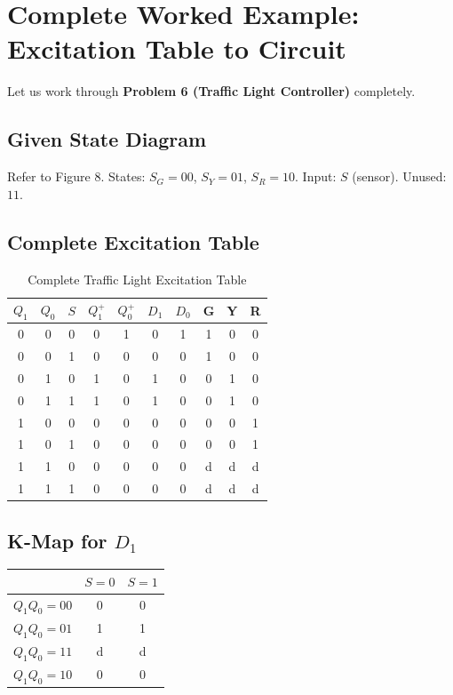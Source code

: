 \documentclass[12pt,a4paper]{article}
\begin{document}
\section{Complete Worked Example: Excitation Table to Circuit}
\label{sec:full_example}

Let us work through \textbf{Problem 6 (Traffic Light Controller)} completely.

\subsection{Given State Diagram}
Refer to Figure 8. States: $S_G=00$, $S_Y=01$, $S_R=10$. Input: $S$ (sensor). Unused: $11$.

\subsection{Complete Excitation Table}

\begin{table}[H]
\centering
\caption{Complete Traffic Light Excitation Table}
\begin{tabular}{ccc|cc|cc|ccc}
\toprule
$Q_1$ & $Q_0$ & $S$ & $Q_1^+$ & $Q_0^+$ & $D_1$ & $D_0$ & G & Y & R \\
\midrule
0 & 0 & 0 & 0 & 1 & 0 & 1 & 1 & 0 & 0 \\
0 & 0 & 1 & 0 & 0 & 0 & 0 & 1 & 0 & 0 \\
0 & 1 & 0 & 1 & 0 & 1 & 0 & 0 & 1 & 0 \\
0 & 1 & 1 & 1 & 0 & 1 & 0 & 0 & 1 & 0 \\
1 & 0 & 0 & 0 & 0 & 0 & 0 & 0 & 0 & 1 \\
1 & 0 & 1 & 0 & 0 & 0 & 0 & 0 & 0 & 1 \\
1 & 1 & 0 & 0 & 0 & 0 & 0 & d & d & d \\
1 & 1 & 1 & 0 & 0 & 0 & 0 & d & d & d \\
\bottomrule
\end{tabular}
\end{table}

\subsection{K-Map for $D_1$}

\begin{table}[H]
\centering
\begin{tabular}{c|cc}
& $S=0$ & $S=1$ \\
\midrule
$Q_1 Q_0 = 00$ & 0 & 0 \\
$Q_1 Q_0 = 01$ & \cellcolor{green!20}1 & \cellcolor{green!20}1 \\
$Q_1 Q_0 = 11$ & \cellcolor{gray!20}d & \cellcolor{gray!20}d \\
$Q_1 Q_0 = 10$ & 0 & 0 \\
\end{tabular}
\end{table}
\end{document}

